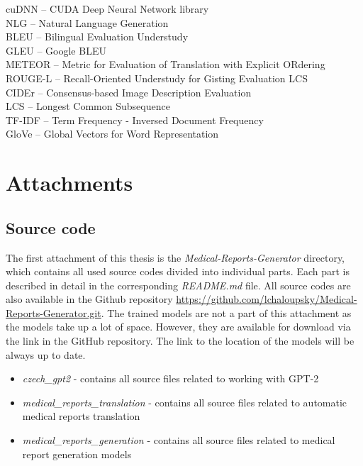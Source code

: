 \documentclass[12pt,a4paper]{report}
\begin{document}
cuDNN -- CUDA Deep Neural Network library\\
NLG -- Natural Language Generation\\
BLEU -- Bilingual Evaluation Understudy\\
GLEU -- Google BLEU\\
METEOR -- Metric for Evaluation of Translation with Explicit ORdering\\
ROUGE-L -- Recall-Oriented Understudy for Gisting Evaluation LCS\\
CIDEr -- Consensus-based Image Description Evaluation\\
LCS -- Longest Common Subsequence\\
TF-IDF -- Term Frequency - Inversed Document Frequency\\
GloVe -- Global Vectors for Word Representation

\appendix
\chapter{Attachments}

\section{Source code}
\label{add:Codes}
The first attachment of this thesis is the \textit{Medical-Reports-Generator} directory, which contains all used source codes divided into individual parts. Each part is described in detail in the corresponding \textit{README.md} file. All source codes are also available in the Github repository \url{https://github.com/lchaloupsky/Medical-Reports-Generator.git}. The trained models are not a part of this attachment as the models take up a lot of space. However, they are available for download via the link in the GitHub repository. The link to the location of the models will be always up to date.
\begin{itemize}
	\item \textit{czech\_gpt2} - contains all source files related to working with GPT-2
	\item \textit{medical\_reports\_translation} - contains all source files related to automatic medical reports translation
	\item \textit{medical\_reports\_generation} - contains all source files related to medical report generation models
\end{itemize}
\end{document}
